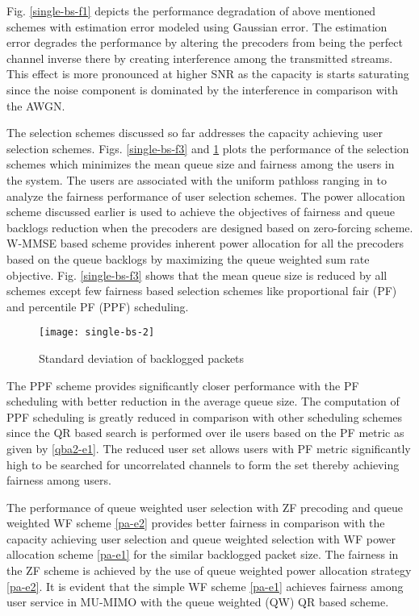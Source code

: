 Fig. \ref{single-bs-f1} depicts the performance degradation of above mentioned schemes with  estimation error modeled using Gaussian error. The estimation error degrades the performance by altering the precoders from being the perfect channel inverse there by creating interference among the transmitted streams. This effect is more pronounced at higher SNR as the capacity is starts saturating since the noise component is dominated by the interference in comparison with the AWGN.

The selection schemes discussed so far addresses the capacity achieving user selection schemes. Figs. \ref{single-bs-f3} and \ref{single-bs-f4} plots the performance of the selection schemes which minimizes the mean queue size and fairness among the users in the system. The users are associated with the uniform pathloss ranging in  to analyze the fairness performance of user selection schemes. The power allocation scheme discussed earlier is used to achieve the objectives of fairness and queue backlogs reduction when the precoders are designed based on zero-forcing scheme. W-MMSE based scheme provides inherent power allocation for all the precoders based on the queue backlogs by maximizing the queue weighted sum rate objective. Fig. \ref{single-bs-f3} shows that the mean queue size is reduced by all schemes except few fairness based selection schemes like proportional fair (PF) and percentile PF (PPF) scheduling.
\begin{figure}
\centering
\texttt{[image: single-bs-2]}
\caption[short]{Standard deviation of backlogged packets }
\label{single-bs-f4}
\end{figure}

The PPF scheme provides significantly closer performance with the PF scheduling with better reduction in the average queue size. The computation of PPF scheduling is greatly reduced in comparison with other scheduling schemes since the QR based search is performed over ile users based on the PF metric as given by \eqref{qba2-e1}. The reduced user set allows users with PF metric significantly high to be searched for uncorrelated channels to form the set  thereby achieving fairness among users.

The performance of queue weighted user selection with ZF precoding and queue weighted WF scheme \eqref{pa-e2} provides better fairness in comparison with the capacity achieving user selection and queue weighted selection with WF power allocation scheme \eqref{pa-e1} for the similar backlogged packet size. The fairness in the ZF scheme is achieved by the use of queue weighted power allocation strategy \eqref{pa-e2}. It is evident that the simple WF scheme \eqref{pa-e1} achieves fairness among user service in MU-MIMO with the queue weighted (QW) QR based scheme. 

